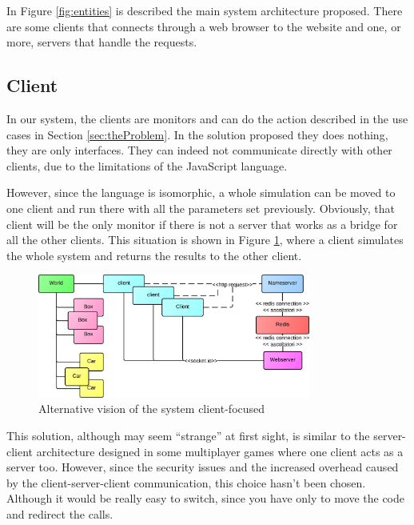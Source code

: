 In Figure \ref{fig:entities} is described the main system architecture proposed. There are some clients that connects through a web browser to the website and one, or more, servers that handle the requests.

\subsection{Client}

In our system, the clients are monitors and can do the action described in the use cases in Section \ref{sec:theProblem}. In the solution proposed they does nothing, they are only interfaces. They can indeed not communicate directly with other clients, due to the limitations of the JavaScript language. 

However, since the language is isomorphic, a whole simulation can be moved to one client and run there with all the parameters set previously. Obviously, that client will be the only monitor if there is not a server that works as a bridge for all the other clients. This situation is shown in Figure \ref{fig:entitiesMagicClient}, where a client simulates the whole system and returns the results to the other client.

\begin{figure}[H]
\centering %
\includegraphics[width=0.8\textwidth]{./img/SystemAnalysis/EntitiesMagicClient.png}
\caption{Alternative vision of the system client-focused}
\label{fig:entitiesMagicClient}
\end{figure}

This solution, although may seem ``strange'' at first sight, is similar to the server-client architecture designed in some multiplayer games where one client acts as a server too. However, since the security issues and the increased overhead caused by the client-server-client communication, this choice hasn't been chosen. Although it would be really easy to switch, since you have only to move the code and redirect the calls.

